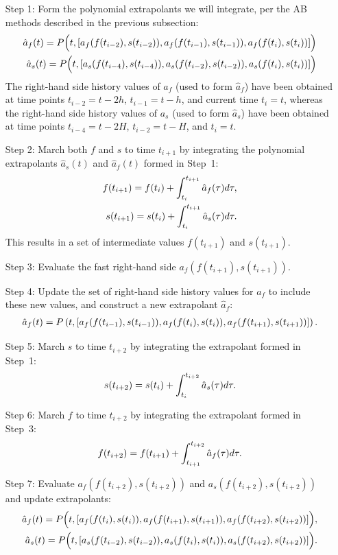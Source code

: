 \begin{itemize}[leftmargin=0.5in]
\item[Step 1:] Form the polynomial extrapolants we will integrate, per the AB
	methods described in the previous subsection:	
\begin{align}
\hat{a}_{f}(t) = P\Big(t, [a_{f}(f(t_{i-2}), s(t_{i-2})), a_{f}(f(t_{i-1}), s(t_{i-1})), a_{f}(f(t_{i}), s(t_{i}))]\Big) \notag \\
\hat{a}_{s}(t) = P\Big(t, [a_{s}(f(t_{i-4}), s(t_{i-4})), a_{s}(f(t_{i-2}), s(t_{i-2})), a_{s}(f(t_{i}), s(t_{i}))]\Big) \notag
\end{align}	
	The right-hand side history
	values of $a_{f}$ (used to form $\hat{a}_{f}$) have been obtained at
	time points $t_{i - 2} = t - 2h$, $t_{i-1} = t - h$, and current time
	$t_{i} = t$, whereas the right-hand side history values of $a_{s}$
	(used to form $\hat{a}_{s}$) have been obtained at time points $t_{i-4}
	= t - 2H$, $t_{i-2} = t - H$, and $t_{i} = t$.
\item[Step 2:] March both $f$ and $s$ to time $t_{i+1}$ by integrating the
	polynomial extrapolants $\hat{a}_{s}(t)$ and $\hat{a}_{f}(t)$ formed in
	Step~1:
\begin{align}
f(t_{i+1}) = f(t_{i}) + \int_{t_{i}}^{t_{i+1}} \hat{a}_{f}(\tau) d\tau, \notag \\
s(t_{i+1}) = s(t_{i}) + \int_{t_{i}}^{t_{i+1}} \hat{a}_{s}(\tau) d\tau. \notag
\end{align}
This results in a set of intermediate values $f(t_{i+1})$ and $s(t_{i+1})$.
\item[Step 3:] Evaluate the fast right-hand side $a_{f}(f(t_{i+1}), s(t_{i+1}))$.
\item[Step 4:] Update the set of right-hand side history values for $a_{f}$ to include these new values, and construct a new extrapolant $\hat{a}_{f}$:
\begin{align}
\hat{a}_{f}(t) = P\left(t, [a_{f}(f(t_{i-1}), s(t_{i-1})), a_{f}(f(t_{i}), s(t_{i})), a_{f}(f(t_{i+1}), s(t_{i+1}))]\right). \notag
\end{align}
\item[Step 5:] March $s$ to time $t_{i+2}$ by integrating the extrapolant formed in Step~1:
\begin{align}
s(t_{i+2}) = s(t_{i}) + \int_{t_{i}}^{t_{i+2}} \hat{a}_{s}(\tau) d\tau. \notag
\end{align}
\item[Step 6:] March $f$ to time $t_{i+2}$ by integrating the extrapolant formed in Step~3:
\begin{align}
f(t_{i+2}) =  f(t_{i+1}) + \int_{t_{i+1}}^{t_{i+2}} \hat{a}_{f}(\tau) d\tau. \notag
\end{align}
\item[Step 7:] Evaluate $a_{f}(f(t_{i+2}), s(t_{i+2}))$ and $a_{s}(f(t_{i+2}), s(t_{i+2}))$ and update extrapolants:
 \begin{align}
\hat{a}_{f}(t) = P\Big(t, [a_{f}(f(t_{i}), s(t_{i})), a_{f}(f(t_{i+1}), s(t_{i+1})), a_{f}(f(t_{i+2}), s(t_{i+2}))]\Big), \notag \\
\hat{a}_{s}(t) = P\Big(t, [a_{s}(f(t_{i-2}), s(t_{i-2})), a_{s}(f(t_{i}), s(t_{i})), a_{s}(f(t_{i+2}), s(t_{i+2}))]\Big). \notag
\end{align}
\end{itemize}
